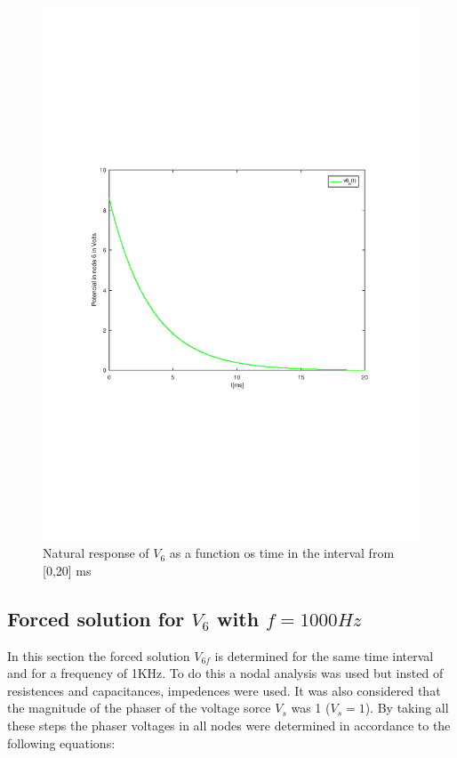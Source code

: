 \begin{figure}[H] \centering
\includegraphics[width=0.9\linewidth]{natural_tab.pdf}
\caption{Natural response of $V_6$ as a function os time in the interval from [0,20] ms}
\label{fig:natural}
\end{figure} 


\pagebreak
\subsection{Forced solution for $V_6$ with $f=1000Hz$}

In this section the forced solution $V_{6f}$ is determined for the same time interval and for a frequency of 1KHz. To do this a nodal analysis was used but insted of resistences and capacitances, impedences were used. It was also  considered that the magnitude of the phaser of the voltage sorce $V_s$  was 1 ($V_s=1$). By taking all these steps the phaser voltages in all nodes were determined in accordance to the following equations:

